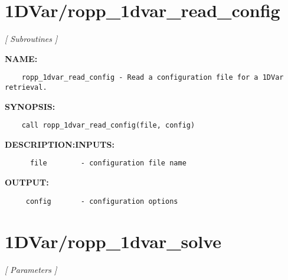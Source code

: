 \section{1DVar/ropp\_1dvar\_read\_config}
\textsl{[ Subroutines ]}

\label{ch:robo4}
\label{ch:1DVar_ropp_1dvar_read_config}
\textbf{NAME:}\hspace{0.08in}\begin{Verbatim}
    ropp_1dvar_read_config - Read a configuration file for a 1DVar retrieval.
\end{Verbatim}
\textbf{SYNOPSIS:}\hspace{0.08in}\begin{Verbatim}
    call ropp_1dvar_read_config(file, config)
\end{Verbatim}
\textbf{DESCRIPTION:}\hspace{0.08in}\textbf{INPUTS:}\hspace{0.08in}\begin{Verbatim}
      file        - configuration file name
\end{Verbatim}
\textbf{OUTPUT:}\hspace{0.08in}\begin{Verbatim}
     config       - configuration options
\end{Verbatim}
\section{1DVar/ropp\_1dvar\_solve}
\textsl{[ Parameters ]}

